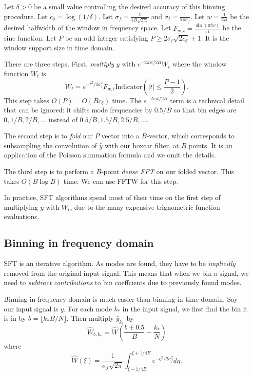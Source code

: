 \documentclass[10pt]{article}
\begin{document}
Let $\delta>0$ be a small value controlling the desired accuracy of this binning procedure. Let $c_{\delta} = \log (1/\delta)$. Let $\sigma_f = \frac{1}{4B\sqrt{2c_{\delta}}}$ and $\sigma_t = \frac{1}{2\pi \sigma_f}$. Let $w=\frac{1}{2B}$ be the desired halfwidth of the window in frequency space. Let $F_{w,t} = \frac{\sin(\pi t w)}{\pi t}$ be the sinc function. Let $P$ be an odd integer satisfying $P \geq 2\sigma_t \sqrt{2c_{\delta}} + 1$. It is the window support size in time domain.

There are three steps. First, \emph{multiply} $y$ with $e^{-2\pi i t/2B}W_t$ where the window function $W_t$ is 
$$W_t = e^{-t^2/2\sigma_t^2} F_{w,t} \text{Indicator}\left(|t|\leq \frac{P-1}{2}\right).$$
This step takes $O(P)=O(B c_{\delta})$ time. The $e^{-2\pi i t/2B}$ term is a technical detail that can be ignored: it shifts mode frequencies by $0.5/B$ so that bin edges are $0, 1/B, 2/B, \ldots$ instead of $0.5/B, 1.5/B, 2.5/B, \ldots$.

The second step is to \emph{fold} our $P$ vector into a $B$-vector, which corresponds to subsampling the convolution of $\hat{y}$ with our boxcar filter, at $B$ points. It is an application of the Poisson summation formula and we omit the details.

The third step is to perform a $B$-point \emph{dense FFT} on our folded vector. This takes $O(B\log B)$ time. We can use FFTW for this step.

In practice, SFT algorithms spend most of their time on the first step of multiplying $y$ with $W_t$, due to the many expensive trignometric function evaluations.

\subsection{Binning in frequency domain}

SFT is an iterative algorithm. As modes are found, they have to be \emph{implicitly} removed from the original input signal. This means that when we bin a signal, we need to \emph{subtract contributions} to bin coeffcients due to previously found modes.

Binning in frequency domain is much easier than binning in time domain. Say our input signal is $y$. For each mode $k_*$ in the input signal, we first find the bin it is in by $b = \lfloor k_* B/N \rfloor$. Then multiply $\hat{y}_{k_*}$ by
$$\hat{W}_{b,k_*} = \hat{W}\left(\frac{b+0.5}{B}-\frac{k_*}{N}\right)$$
where
$$\hat{W}(\xi)=\frac{1}{\sigma_f \sqrt{2\pi}} \int_{\xi-1/4B}^{\xi+1/4B} e^{-\eta^2/2\sigma_f^2} d\eta.$$
\end{document}
